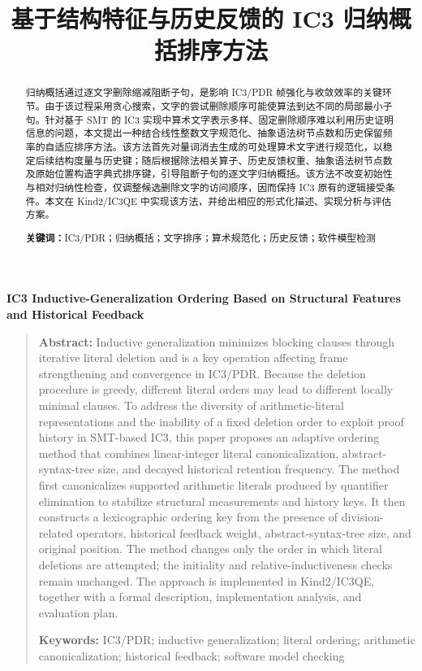 \documentclass[11pt,a4paper]{article}
\title{基于结构特征与历史反馈的 IC3 归纳概括排序方法}
\author{}
\date{}
\begin{document}
\maketitle

\begin{abstract}
归纳概括通过逐文字删除缩减阻断子句，是影响 IC3/PDR 帧强化与收敛效率的关键环节。由于该过程采用贪心搜索，文字的尝试删除顺序可能使算法到达不同的局部最小子句。针对基于 SMT 的 IC3 实现中算术文字表示多样、固定删除顺序难以利用历史证明信息的问题，本文提出一种结合线性整数文字规范化、抽象语法树节点数和历史保留频率的自适应排序方法。该方法首先对量词消去生成的可处理算术文字进行规范化，以稳定后续结构度量与历史键；随后根据除法相关算子、历史反馈权重、抽象语法树节点数及原始位置构造字典式排序键，引导阻断子句的逐文字归纳概括。该方法不改变初始性与相对归纳性检查，仅调整候选删除文字的访问顺序，因而保持 IC3 原有的逻辑接受条件。本文在 Kind2/IC3QE 中实现该方法，并给出相应的形式化描述、实现分析与评估方案。

\noindent\textbf{关键词：}IC3/PDR；归纳概括；文字排序；算术规范化；历史反馈；软件模型检测
\end{abstract}

\begin{center}
  \large\bfseries IC3 Inductive-Generalization Ordering Based on
  Structural Features and Historical Feedback
\end{center}
\begin{quote}
\small
\noindent\textbf{Abstract:}
Inductive generalization minimizes blocking clauses through iterative literal deletion and is a key operation affecting frame strengthening and convergence in IC3/PDR. Because the deletion procedure is greedy, different literal orders may lead to different locally minimal clauses. To address the diversity of arithmetic-literal representations and the inability of a fixed deletion order to exploit proof history in SMT-based IC3, this paper proposes an adaptive ordering method that combines linear-integer literal canonicalization, abstract-syntax-tree size, and decayed historical retention frequency. The method first canonicalizes supported arithmetic literals produced by quantifier elimination to stabilize structural measurements and history keys. It then constructs a lexicographic ordering key from the presence of division-related operators, historical feedback weight, abstract-syntax-tree size, and original position. The method changes only the order in which literal deletions are attempted; the initiality and relative-inductiveness checks remain unchanged. The approach is implemented in Kind2/IC3QE, together with a formal description, implementation analysis, and evaluation plan.

\noindent\textbf{Keywords:} IC3/PDR; inductive generalization; literal ordering; arithmetic canonicalization; historical feedback; software model checking
\end{quote}
\end{document}
